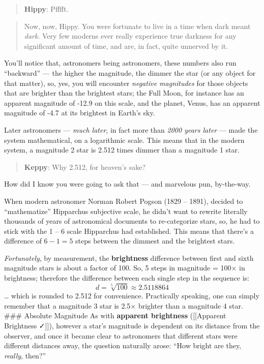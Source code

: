 \documentclass[
  letterpaper,
]{book}
\begin{document}
\begin{quote}
\textbf{Hippy}: Pfffft.
\end{quote}

\begin{quote}
Now, now, Hippy. You were fortunate to live in a time when dark meant
\emph{dark}. Very few moderns ever really experience true darkness for
any significant amount of time, and are, in fact, quite unnerved by it.
\end{quote}

You'll notice that, astronomers being astronomers, these numbers also
run ``backward'' --- the higher the magnitude, the dimmer the star (or
any object for that matter), so, yes, you will encounter \emph{negative
magnitudes} for those objects that are brighter than the brightest
stars; the Full Moon, for instance has an apparent magnitude of -12.9 on
this scale, and the planet, Venus, has an apparent magnitude of -4.7 at
its brightest in Earth's sky.

Later astronomers --- \emph{much later}, in fact more than \emph{2000
years later} --- made the system mathematical, on a logarithmic scale.
This means that in the modern system, a magnitude 2 star is 2.512 times
dimmer than a magnitude 1 star.

\begin{quote}
\textbf{Keppy}: Why 2.512, for heaven's sake?
\end{quote}

How did I know you were going to ask that --- and marvelous pun,
by-the-way.

When modern astronomer Norman Robert Pogson (1829 -- 1891), decided to
``mathematize'' Hipparchus subjective scale, he didn't want to rewrite
literally thousands of years of astronomical documents to re-categorize
stars, so, he had to stick with the 1 -- 6 scale Hipparchus had
established. This means that there's a difference of \(6 - 1 = 5\) steps
between the dimmest and the brightest stars.

\emph{Fortunately}, by measurement, the \textbf{brightness} difference
between first and sixth magnitude stars is about a factor of 100. So, 5
steps in magnitude = 100× in brightness; therefore the difference
between each single step in the sequence is: \[
d = \sqrt[5]{100} \approx 2.5118864
\] \ldots{} which is rounded to 2.512 for convenience. Practically
speaking, one can simply remember that a magnitude 3 star is 2.5×
brighter than a magnitude 4 star. \#\#\# Absolute Magnitude As with
\textbf{apparent brightness} ({[}{[}Apparent Brightness ✓{]}{]}),
however a star's magnitude is dependent on its distance from the
observer, and once it became clear to astronomers that different stars
were different distances away, the question naturally arose: ``How
bright are they, \emph{really}, then?''
\end{document}
